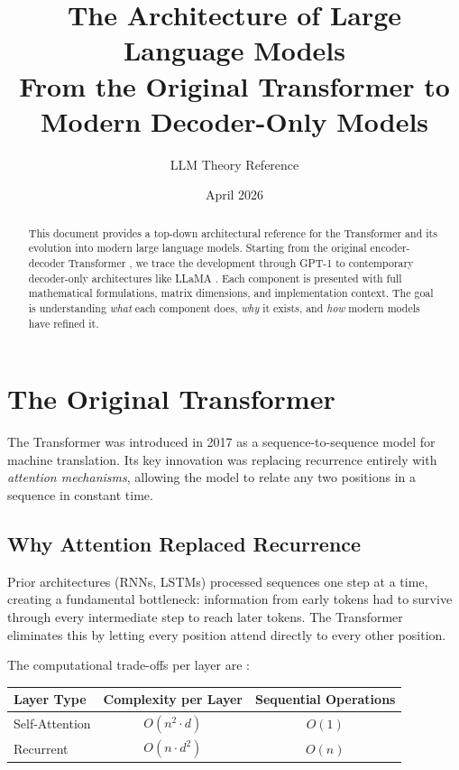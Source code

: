 \documentclass[11pt,a4paper]{article}
\title{\textbf{The Architecture of Large Language Models}\\[0.5em]
\large From the Original Transformer to Modern Decoder-Only Models}
\author{LLM Theory Reference}
\date{April 2026}
\begin{document}
\maketitle

\begin{abstract}
This document provides a top-down architectural reference for the Transformer and its
evolution into modern large language models. Starting from the original encoder-decoder
Transformer \cite{vaswani2017}, we trace the development through GPT-1 \cite{radford2018}
to contemporary decoder-only architectures like LLaMA \cite{touvron2023}. Each component
is presented with full mathematical formulations, matrix dimensions, and implementation
context. The goal is understanding \emph{what} each component does, \emph{why} it exists,
and \emph{how} modern models have refined it.
\end{abstract}

\tableofcontents
\newpage

\section{The Original Transformer}
\label{sec:transformer}

The Transformer \cite{vaswani2017} was introduced in 2017 as a sequence-to-sequence model
for machine translation. Its key innovation was replacing recurrence entirely with
\emph{attention mechanisms}, allowing the model to relate any two positions in a sequence
in constant time.

\subsection{Why Attention Replaced Recurrence}

Prior architectures (RNNs, LSTMs) processed sequences one step at a time, creating a
fundamental bottleneck: information from early tokens had to survive through every
intermediate step to reach later tokens. The Transformer eliminates this by letting every
position attend directly to every other position.

The computational trade-offs per layer are \cite{vaswani2017}:

\begin{center}
\begin{tabular}{lcc}
\toprule
\textbf{Layer Type} & \textbf{Complexity per Layer} & \textbf{Sequential Operations} \\
\midrule
Self-Attention & $O(n^2 \cdot d)$ & $O(1)$ \\
Recurrent & $O(n \cdot d^2)$ & $O(n)$ \\
\bottomrule
\end{tabular}
\end{center}
\end{document}
